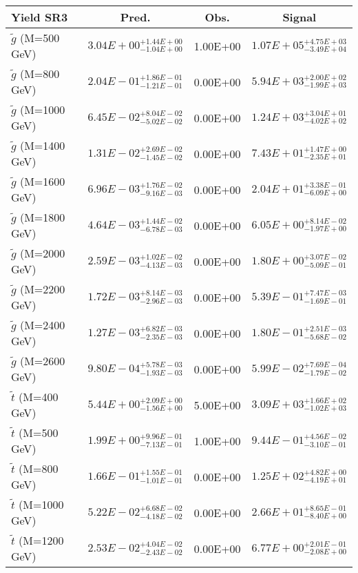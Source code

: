 \documentclass{article}
\begin{document}
 \begin{center}
 \begin{tabular}{ |l|c|c|c| } 
 \hline
 Yield SR3 & Pred. & Obs. & Signal \\
 \hline
 \hline
 $\tilde{g}$ (M=500 GeV) & $3.04E+00^{+1.44E+00}_{-1.04E+00}$ & 1.00E+00 & $1.07E+05^{+4.75E+03}_{-3.49E+04}$ \\
 \hline
 $\tilde{g}$ (M=800 GeV) & $2.04E-01^{+1.86E-01}_{-1.21E-01}$ & 0.00E+00 & $5.94E+03^{+2.00E+02}_{-1.99E+03}$ \\
 \hline
 $\tilde{g}$ (M=1000 GeV) & $6.45E-02^{+8.04E-02}_{-5.02E-02}$ & 0.00E+00 & $1.24E+03^{+3.04E+01}_{-4.02E+02}$ \\
 \hline
 $\tilde{g}$ (M=1400 GeV) & $1.31E-02^{+2.69E-02}_{-1.45E-02}$ & 0.00E+00 & $7.43E+01^{+1.47E+00}_{-2.35E+01}$ \\
 \hline
 $\tilde{g}$ (M=1600 GeV) & $6.96E-03^{+1.76E-02}_{-9.16E-03}$ & 0.00E+00 & $2.04E+01^{+3.38E-01}_{-6.09E+00}$ \\
 \hline
 $\tilde{g}$ (M=1800 GeV) & $4.64E-03^{+1.44E-02}_{-6.78E-03}$ & 0.00E+00 & $6.05E+00^{+8.14E-02}_{-1.97E+00}$ \\
 \hline
 $\tilde{g}$ (M=2000 GeV) & $2.59E-03^{+1.02E-02}_{-4.13E-03}$ & 0.00E+00 & $1.80E+00^{+3.07E-02}_{-5.09E-01}$ \\
 \hline
 $\tilde{g}$ (M=2200 GeV) & $1.72E-03^{+8.14E-03}_{-2.96E-03}$ & 0.00E+00 & $5.39E-01^{+7.47E-03}_{-1.69E-01}$ \\
 \hline
 $\tilde{g}$ (M=2400 GeV) & $1.27E-03^{+6.82E-03}_{-2.35E-03}$ & 0.00E+00 & $1.80E-01^{+2.51E-03}_{-5.68E-02}$ \\
 \hline
 $\tilde{g}$ (M=2600 GeV) & $9.80E-04^{+5.78E-03}_{-1.93E-03}$ & 0.00E+00 & $5.99E-02^{+7.69E-04}_{-1.79E-02}$ \\
 \hline
 $\tilde{t}$ (M=400 GeV) & $5.44E+00^{+2.09E+00}_{-1.56E+00}$ & 5.00E+00 & $3.09E+03^{+1.66E+02}_{-1.02E+03}$ \\
 \hline
 $\tilde{t}$ (M=500 GeV) & $1.99E+00^{+9.96E-01}_{-7.13E-01}$ & 1.00E+00 & $9.44E-01^{+4.56E-02}_{-3.10E-01}$ \\
 \hline
 $\tilde{t}$ (M=800 GeV) & $1.66E-01^{+1.55E-01}_{-1.01E-01}$ & 0.00E+00 & $1.25E+02^{+4.82E+00}_{-4.19E+01}$ \\
 \hline
 $\tilde{t}$ (M=1000 GeV) & $5.22E-02^{+6.68E-02}_{-4.18E-02}$ & 0.00E+00 & $2.66E+01^{+8.65E-01}_{-8.40E+00}$ \\
 \hline
 $\tilde{t}$ (M=1200 GeV) & $2.53E-02^{+4.04E-02}_{-2.43E-02}$ & 0.00E+00 & $6.77E+00^{+2.01E-01}_{-2.08E+00}$ \\

\end{tabular}
\end{center}
\end{document}
